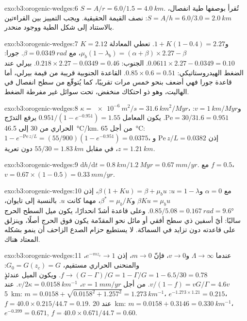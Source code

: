 \begin{solution}{exo:b3:orogenic-wedges:6}
$S = A/r = 6.0/1.5 = \qty{4.0}{km}$. تُقرأ بوصفها طية انفصال، $S = A/h =
6.0/3.0 = \qty{2.0}{km}$: نصف القيمة الحقيقية. ويجب التمييز بين القراءتين
بالاستناد إلى شكل الطية ووجود منحدر.
\end{solution}

\begin{solution}{exo:b3:orogenic-wedges:7}
$K = 2.12$ و$1 + K(1 - 0.4) = 2.27$. تعطي المعادلة $\mu_b(1 -
\lambda_b) = (\alpha + \beta)\times2.27 - \beta$، مع $\beta =
\qty{0.0349}{rad}$. جورا: $0.0611\times2.27 - 0.0349 = 0.10$. الجنوب:
$0.218\times2.27 - 0.0349 = 0.46$. بيرلي عند الضغط الهيدروستاتيكي:
$0.85\times0.6 = 0.51$. القاعدة الجنوبية قريبة من قيمة بيرلي، أما
قاعدة جورا فهي أضعف بنحو خمس مرات تقريبًا، كما يُتوقّع من سطح انفصال في
الهاليت، وهو ذو احتكاك منخفض، تحت سوائل غير مفرطة الضغط.
\end{solution}

\begin{solution}{exo:b3:orogenic-wedges:8}
$\kappa = \qty{e-6}{m^2/s} = \qty{31.6}{km^2/Myr}$، و$v =
\qty{1}{km/Myr}$: $\mathrm{Pe} = 30/31.6 = 0.951$. يكون المعامل $0.951/(1 -
e^{-0.951}) = 1.55$ يرفع التدرّج الحراري من 30 إلى \qty{46.5}{\celsius/km}.
من أجل \qty{65}{\celsius}: $1 - e^{-\mathrm{Pe}\,z/L} = (55/900)(1 - e^{-0.951})
= 0.0375$، إذن $\mathrm{Pe}\,z/L = 0.0382$ و$z = \qty{1.21}{km}$، في مقابل
$55/30 = \qty{1.83}{km}$ دون تعرية.
\end{solution}

\begin{solution}{exo:b3:orogenic-wedges:9}
$\mathrm dh/\mathrm dt = \qty{0.8}{km}/\qty{1.2}{Myr} = \qty{0.67}{mm/yr}$.
مع $f = 0.5$، $v = 0.67\times(1 - 0.5) = \qty{0.33}{mm/yr}$.
\end{solution}

\begin{solution}{exo:b3:orogenic-wedges:10}
مع $\alpha = 0$ و$u = 1 - \lambda$: $\beta(1 + Ku) = \beta + \mu_b u$،
إذن $\beta Ku = \mu_b u$ و$\beta^* = \mu_b/K$، مهما كانت $u$. بالنسبة إلى تايوان،
$0.85/5.08 = \qty{0.167}{rad} = \ang{9.6}$. وعلى قاعدة أشدّ انحدارًا، يكون
ميل السطح الحرج سالبًا: أيّ أسفين ذي سطح أفقي أو مائل نحو المقدّمة
يكون فوق الحرج أصلًا، وينزلق على قاعدته دون تزايد في السماكة. لا
يستطيع حزام الصدع الزاحف أن ينمو بشكله المعتاد هناك.
\end{solution}

\begin{solution}{exo:b3:orogenic-wedges:11}
عندما $\Lambda \to \infty$ و$v \to 0$، فإنّ $m \to 0$، إذن $e^{-mz_c} \to 1$،
والمنحنى الحراري مستقيم، $G_0 = G(z_c) = G$: $f \to (G - \Gamma)/G = 1 -
\Gamma/G = 1 - 6.5/30 = 0.78$. ويكون الميل عندئذٍ $v/(1 - f) = vG/\Gamma =
4.6v$. من أجل $v = \qty{1}{mm/yr}$، $v/2\kappa = \qty{0.0158}{km^{-1}}$. عند
\qty{5}{km}: $m = 0.0158 + \sqrt{0.0158^2 + 1.257^2} = \qty{1.273}{km^{-1}}$،
$e^{-1.273\times1.21} = 0.215$، $f = 40.0\times0.215/44.7 = 0.19$. عند
\qty{20}{km}: $m = 0.0158 + 0.3146 = \qty{0.330}{km^{-1}}$، $e^{-0.399} =
0.671$, $f = 40.0\times0.671/44.7 = 0.60$.
\end{solution}

